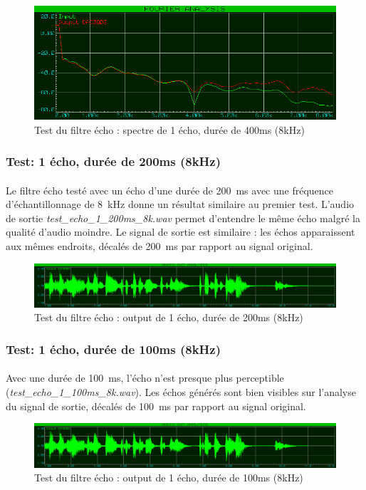 \documentclass{article}
\begin{document}
    \begin{figure}[H]
        \centering
        \includegraphics[width=.6\textwidth]{./images/spectrum_echo_1_400ms_8k.png}
        \caption{Test du filtre écho : spectre de 1 écho, durée de 400ms (8kHz)}
    \end{figure}

    \subsubsection{Test: 1 écho, durée de 200ms (8kHz)}
    \paragraph{}
    Le filtre écho testé avec un écho d'une durée de \SI{200}{\milli\second} avec une fréquence d'échantillonnage de \SI{8}{\kilo\hertz} donne un résultat similaire au premier test. L'audio de sortie \emph{test\_echo\_1\_200ms\_8k.wav} permet d'entendre le même écho malgré la qualité d'audio moindre. Le signal de sortie est similaire : les échos apparaissent aux mêmes endroits, décalés de \SI{200}{\milli\second} par rapport au signal original.
    \begin{figure}[H]
        \centering
        \includegraphics[width=\textwidth]{./images/out_echo_1_200ms_8k.png}
        \caption{Test du filtre écho : output de 1 écho, durée de 200ms (8kHz)}
    \end{figure}

    \subsubsection{Test: 1 écho, durée de 100ms (8kHz)}
    \paragraph{}
    Avec une durée de \SI{100}{\milli\second}, l'écho n'est presque plus perceptible (\emph{test\_echo\_1\_100ms\_8k.wav}). Les échos générés sont bien visibles sur l'analyse du signal de sortie, décalés de \SI{100}{\milli\second} par rapport au signal original.
    \begin{figure}[H]
        \centering
        \includegraphics[width=\textwidth]{./images/out_echo_1_100ms_8k.png}
        \caption{Test du filtre écho : output de 1 écho, durée de 100ms (8kHz)}
    \end{figure}
\end{document}
